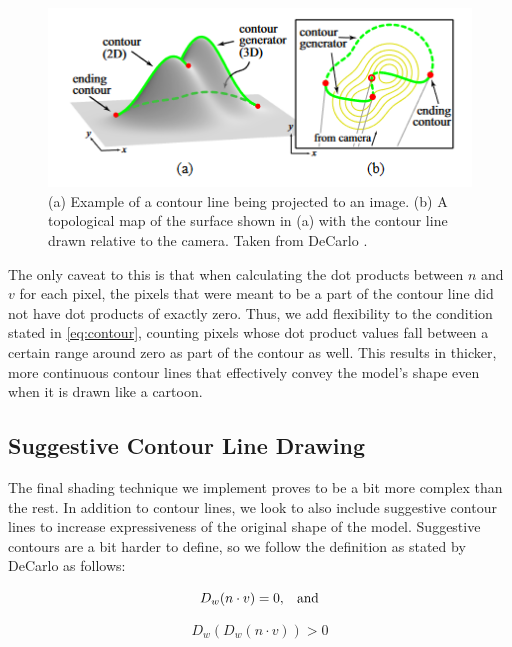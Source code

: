 \documentclass[10pt,twocolumn,letterpaper]{article}
\begin{document}
\begin{figure}
    \centering
    \includegraphics[width=1\linewidth]{contours.png}
    \caption{(a) Example of a contour line being projected to an image. (b) A topological map of the surface shown in (a) with the contour line drawn relative to the camera. Taken from DeCarlo \etal \cite{DeCarlo:2003:SCF}.}
    \label{fig:contour}
\end{figure}

The only caveat to this is that when calculating the dot products between $n$ and $v$ for each pixel, the pixels that were meant to be a part of the contour line did not have dot products of exactly zero. Thus, we add flexibility to the condition stated in \cref{eq:contour}, counting pixels whose dot product values fall between a certain range around zero as part of the contour as well. This results in thicker, more continuous contour lines that effectively convey the model's shape even when it is drawn like a cartoon.

\subsection{Suggestive Contour Line Drawing}

The final shading technique we implement proves to be a bit more complex than the rest. In addition to contour lines, we look to also include suggestive contour lines to increase expressiveness of the original shape of the model. Suggestive contours are a bit harder to define, so we follow the definition as stated by DeCarlo \etal\cite{DeCarlo:2003:SCF} as follows:

\begin{equation}
    D_w(n \cdot v) = 0 \text{,\quad and}
    \label{eq:sugg1}
\end{equation}

\begin{equation}
    D_w(D_w(n \cdot v)) > 0
    \label{eq:sugg2}
\end{equation}
\end{document}
